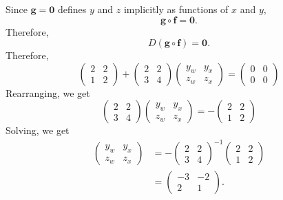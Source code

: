 \documentclass{exam}
\newcommand{\vf}{\mathbf{f}}
\newcommand{\vg}{\mathbf{g}}
\newcommand{\vzero}{\mathbf{0}}
\begin{document}
\begin{questions}
\begin{solution}
        Since $\vg=\vzero$ defines $y$ and $z$ implicitly as functions of $x$ and $y$,
        \[
            \vg\circ\vf = \vzero.
        \]
        Therefore,
        \[
            D(\vg\circ\vf)=\vzero.
        \]
        Therefore,
        \[
            \begin{pmatrix}
                2&2\\1&2
            \end{pmatrix}+ \begin{pmatrix}
                2&2\\3&4
            \end{pmatrix}\begin{pmatrix}
                y_w&y_x\\z_w&z_x
            \end{pmatrix}=\begin{pmatrix}
                0&0\\0&0
            \end{pmatrix}
        \]
        Rearranging, we get
        \[
            \begin{pmatrix}
                2&2\\3&4
            \end{pmatrix}\begin{pmatrix}
                y_w&y_x\\z_w&z_x
            \end{pmatrix}= -\begin{pmatrix}
                2&2\\1&2
            \end{pmatrix}
        \]
        Solving, we get
        \begin{align*}
            \begin{pmatrix}
                y_w&y_x\\z_w&z_x
            \end{pmatrix}&=- \begin{pmatrix}
                2&2\\3&4
            \end{pmatrix}^{-1}\begin{pmatrix}
                2&2\\1&2
            \end{pmatrix}\\
            &= \begin{pmatrix}
                -3&-2\\2&1
            \end{pmatrix}.
        \end{align*}
    \end{solution}
    

\end{questions}
\end{document}
